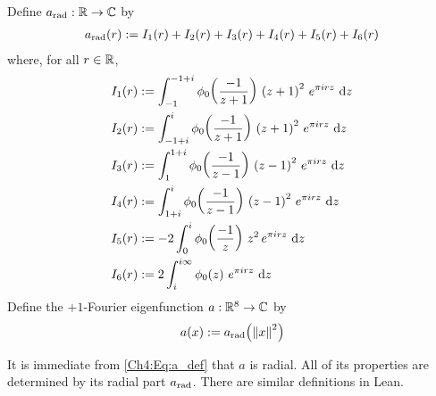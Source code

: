 \begin{boxdefinition}\label{Ch4:Def:a}
    Define $a_{\operatorname{rad}} : \mathbb{R} \to \mathbb{C}$ by
    \begin{align}
        a_{\operatorname{rad}}\!\left( r \right) := I_1(r) + I_2(r) + I_3(r) + I_4(r) + I_5(r) + I_6(r)
            \label{Ch4:Eq:a_rad_def}
    \end{align}
    where, for all $r \in \mathbb{R}$,
    \begin{align}
        I_1(r) &:= \int_{-1}^{-1 + i} \phi_0\of{\frac{-1}{z+1}} \,
                                 \parenth{z + 1}^2 \,
                                 e^{\pi i r z} \,
                                 \diff{z}
            \label{Ch4:Eq:I_1_def} \\
        I_2(r) &:= \int_{-1 + i}^{i} \phi_0\of{\frac{-1}{z+1}} \,
                                 \parenth{z + 1}^2 \,
                                 e^{\pi i r z} \,
                                 \diff{z}
            \label{Ch4:Eq:I_2_def} \\
        I_3(r) &:= \int_{1}^{1 + i} \phi_0\of{\frac{-1}{z - 1}} \,
                                \parenth{z - 1}^2 \,
                                e^{\pi i r z} \,
                                \diff{z}
            \label{Ch4:Eq:I_3_def} \\
        I_4(r) &:= \int_{1 + i}^{i} \phi_0\of{\frac{-1}{z - 1}} \,
                                \parenth{z - 1}^2 \,
                                e^{\pi i r z} \,
                                \diff{z}
            \label{Ch4:Eq:I_4_def} \\
        I_5(r) &:= -2 \int_{0}^{i} \phi_0\of{\frac{-1}{z}} \,
                                z^2 \,
                                e^{\pi i r z} \,
                                \diff{z}
            \label{Ch4:Eq:I_5_def} \\
        I_6(r) &:= 2 \int_{i}^{i \infty} \phi_0\of{z} \,
                                e^{\pi i r z} \,
                                \diff{z}
            \label{Ch4:Eq:I_6_def}
    \end{align}
    Define the $+1$-Fourier eigenfunction $a : \mathbb{R}^8 \to \mathbb{C}$ by
    \begin{align}
        a(x) := a_{\operatorname{rad}}\!\left( \left\lVert x \right\rVert^2 \right)
            \label{Ch4:Eq:a_def}
    \end{align}
\end{boxdefinition}

It is immediate from \eqref{Ch4:Eq:a_def} that $a$ is radial. All of its properties are determined by its radial part $a_{\operatorname{rad}}$. There are similar definitions in Lean.

